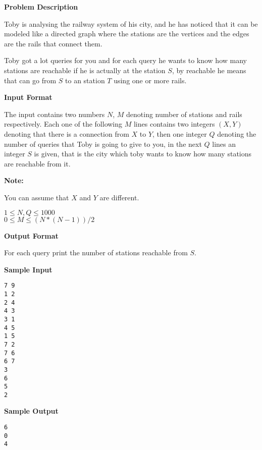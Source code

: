 \textbf{\large Problem Description}

Toby is analysing the railway system of his city, and he has noticed that it can
be modeled like a directed graph where the stations are the vertices and the edges
are the rails that connect them.

Toby got a lot queries for you and for each query he wants to know how many
stations are reachable if he is actually at the station $S$, by reachable he
means that can go from $S$ to an station $T$ using one or more rails.

\textbf{\large Input Format}

The input contains two numbers $N$, $M$ denoting number of stations and rails
respectively. Each one of the following $M$ lines contains two integers $(X, Y)$
denoting that there is a connection from $X$ to $Y$, then one integer $Q$
denoting the number of queries that Toby is going to give to you, in the next $Q$
lines an integer $S$ is given, that is the city which toby wants to know how
many stations are reachable from it.

\textbf{\large Note:}

You can assume that $X$ and $Y$ are different.

$1 \le N, Q \le 1000$ \\
$0 \le M \le (N * (N - 1)) / 2$ %

\textbf{\large Output Format}

For each query print the number of stations reachable from $S$.

\textbf{\large Sample Input}

\begin{verbatim}
7 9
1 2
2 4
4 3
3 1
4 5
1 5
7 2
7 6
6 7
3
6
5
2
\end{verbatim}

\textbf{\large Sample Output}

\begin{verbatim}
6
0
4
\end{verbatim}

\newpage